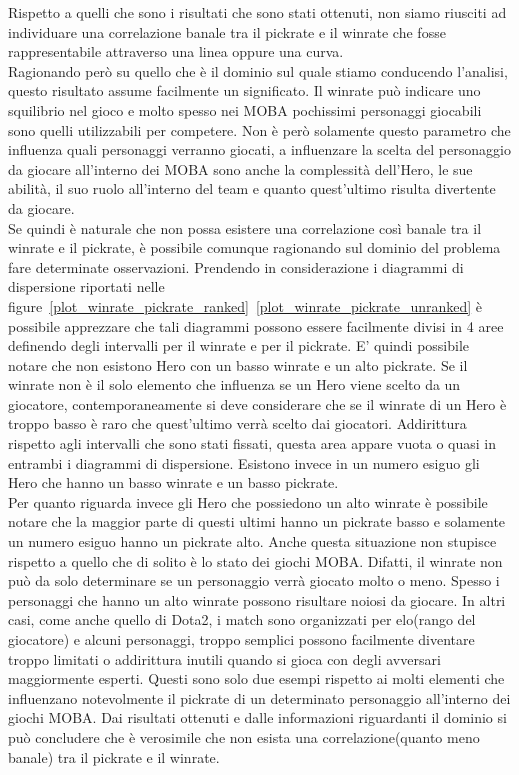 Rispetto a quelli che sono i risultati che sono stati ottenuti, non siamo riusciti ad individuare una correlazione banale tra il pickrate e il winrate che fosse rappresentabile attraverso una linea oppure una curva. \\
Ragionando però su quello che è il dominio sul quale stiamo conducendo l'analisi, questo risultato assume facilmente un significato. Il winrate può indicare uno squilibrio nel gioco e molto spesso nei MOBA pochissimi personaggi giocabili sono quelli utilizzabili per competere. Non è però solamente questo parametro che influenza quali personaggi verranno giocati, a influenzare la scelta del personaggio da giocare all'interno dei MOBA sono anche la complessità dell'Hero, le sue abilità, il suo ruolo all'interno del team e quanto quest'ultimo risulta divertente da giocare. \\
Se quindi è naturale che non possa esistere una correlazione così banale tra il winrate e il pickrate, è possibile comunque ragionando sul dominio del problema fare determinate osservazioni. Prendendo in considerazione i diagrammi di dispersione riportati nelle figure~\ref{plot_winrate_pickrate_ranked}~\ref{plot_winrate_pickrate_unranked} è possibile apprezzare che tali diagrammi possono essere facilmente divisi in 4 aree definendo degli intervalli per il winrate e per il pickrate. E' quindi possibile notare che non esistono Hero con un basso winrate e un alto pickrate. Se il winrate non è il solo elemento che influenza se un Hero viene scelto da un giocatore, contemporaneamente si deve considerare che se il winrate di un Hero è troppo basso è raro che quest'ultimo verrà scelto dai giocatori. Addirittura rispetto agli intervalli che sono stati fissati, questa area appare vuota o quasi in entrambi i diagrammi di dispersione. Esistono invece in un numero esiguo gli Hero che hanno un basso winrate e un basso pickrate. \\
Per quanto riguarda invece gli Hero che possiedono un alto winrate è possibile notare che la maggior parte di questi ultimi hanno un pickrate basso e solamente un numero esiguo hanno un pickrate alto. Anche questa situazione non stupisce rispetto a quello che di solito è lo stato dei giochi MOBA. Difatti, il winrate non può da solo determinare se un personaggio verrà giocato molto o meno. Spesso i personaggi che hanno un alto winrate possono risultare noiosi da giocare. In altri casi, come anche quello di Dota2, i match sono organizzati per elo(rango del giocatore) e alcuni personaggi, troppo semplici possono facilmente diventare troppo limitati o addirittura inutili quando si gioca con degli avversari maggiormente esperti. Questi sono solo due esempi rispetto ai molti elementi che influenzano notevolmente il pickrate di un determinato personaggio all'interno dei giochi MOBA. Dai risultati ottenuti e dalle informazioni riguardanti il dominio si può concludere che è verosimile che non esista una correlazione(quanto meno banale) tra il pickrate e il winrate. 
